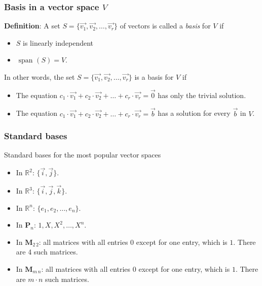 \begin{frame}[fragile]
\frametitle{Basis in a vector space $V$}

\textbf{Definition}: A set $S = \{ \vec{v_1}, \vec{v_2}, \ldots, \vec{v_r} \}$ of vectors is called a {\em basis} for $V$ if
\begin{itemize}
\item $S$ is linearly independent

\item $\text{ span } (S) = V$.
\end{itemize}


\bigskip

In other words, the set $S = \{ \vec{v_1}, \vec{v_2}, \ldots, \vec{v_r} \}$ is a basis for $V$ if
\begin{itemize}
\item The equation $c_1 \cdot \vec{v_1} + c_2 \cdot \vec{v_2} + \ldots + c_r \cdot \vec{v_r} = \vec{0}$ has only the trivial solution.

\item The equation $c_1 \cdot \vec{v_1} + c_2 \cdot \vec{v_2} + \ldots + c_r \cdot \vec{v_r} = \vec{b}$ has a solution for every $\vec{b}$ in $V$.
\end{itemize}


\end{frame}


\begin{frame}[fragile]
\frametitle{Standard bases}

Standard bases for the most popular vector spaces

\begin{itemize}
\item In $\mathbb{R}^2$: $\{ \vec{i}, \vec{j} \}$.

\smallskip

\item In $\mathbb{R}^3$: $\{ \vec{i}, \vec{j}, \vec{k} \}$.

\smallskip

\item In $\mathbb{R}^n$: $\{ e_1, e_2, \ldots, e_n \}$.

\smallskip

\item In $\textbf{P}_n$: $1, X, X^2, \ldots, X^n$.

\smallskip

\item In $\textbf{M}_{2 \, 2}$: all matrices with all entries $0$ except for one entry, which is $1$. There are 4 such matrices.

\smallskip

\item In $\textbf{M}_{m \, n}$: all matrices with all entries $0$ except for one entry, which is $1$. There are $m \cdot n$ such matrices.

\end{itemize}


\end{frame}


